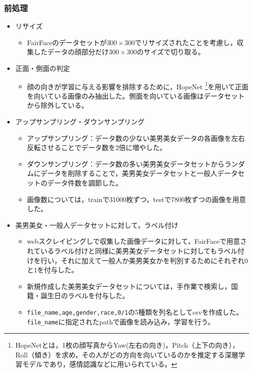 \documentclass[a4paper,11pt,titlepage]{jsarticle}
\begin{document}
\subsubsection{前処理}
\begin{itemize}
    \item リサイズ
        \begin{itemize}
            \item FairFaceのデータセットが$300 \times 300$でリサイズされたことを考慮し，収集したデータの顔部分だけ$300 \times 300$のサイズで切り取る。
        \end{itemize}
    \item 正面・側面の判定
        \begin{itemize}
            \item 顔の向きが学習に与える影響を排除するために，HopeNet \footnote{ HopeNetとは，1枚の顔写真からYaw(左右の向き)，Pitch（上下の向き），Roll（傾き）を求め，その人がどの方向を向いているのかを推定する深層学習モデルであり，感情認識などに用いられている。\cite{hopenet_paper}\cite{hopenet} }を用いて正面を向いている画像のみ抽出した。側面を向いている画像はデータセットから除外している。
        \end{itemize}
    \item アップサンプリング・ダウンサンプリング
        \begin{itemize}
            \item アップサンプリング：データ数の少ない美男美女データの各画像を左右反転させることでデータ数を2倍に増やした。
            \item ダウンサンプリング：データ数の多い美男美女データセットからランダムにデータを削除することで，美男美女データセットと一般人データセットのデータ件数を調節した。
            \item 画像数については，trainで31000枚ずつ，testで7800枚ずつの画像を用意した。
        \end{itemize}
    \item 美男美女・一般人データセットに対して，ラベル付け
        \begin{itemize}
            \item webスクレイピングしで収集した画像データに対して，FairFaceで用意されているラベル付けと同様に美男美女データセットに対してもラベル付けを行い，それに加えて一般人か美男美女かを判別するためにそれぞれ0と1を付与した。
            \item 新規作成した美男美女データセットについては，手作業で検索し，国籍・誕生日のラベルを付与した。
            \item \texttt{file\_name,age,gender,race,0/1}の5種類を列名としてcsvを作成した。\texttt{file\_name}に指定されたpathで画像を読み込み，学習を行う。
        \end{itemize}
\end{itemize}
\end{document}

